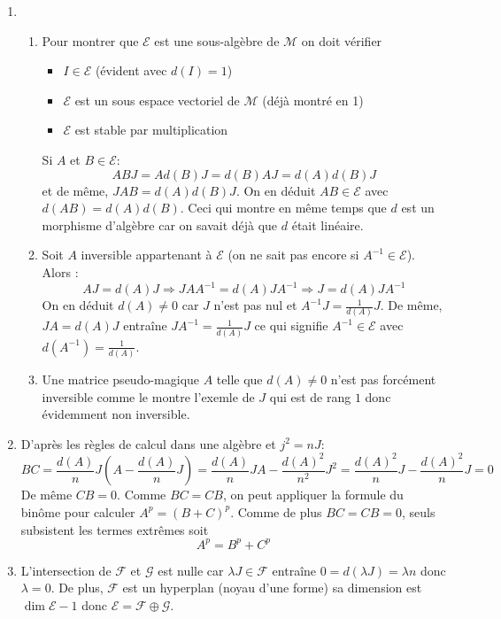 \begin{enumerate}
\item 
\begin{enumerate}
\item  Pour montrer que $\mathcal{E}$ est une sous-alg\`{e}bre de $\mathcal{M}$ on doit v\'{e}rifier

\begin{itemize}
\item  $I\in \mathcal{E}$ (\'{e}vident avec $d(I)=1$)

\item  $\mathcal{E}$ est un sous espace vectoriel de $\mathcal{M}$ (d\'{e}j\`{a} montr\'{e} en 1)

\item  $\mathcal{E}$ est stable par multiplication
\end{itemize}

Si $A$ et $B\in \mathcal{E}$:
\begin{displaymath}
ABJ=Ad(B)J=d(B)AJ=d(A)d(B)J 
\end{displaymath}
et de m\^{e}me, $JAB=d(A)d(B)J$. On en d\'{e}duit $AB\in \mathcal{E}$ avec $d(AB)=d(A)d(B)$. 
Ceci qui montre en m\^{e}me temps que $d$ est un morphisme d'algèbre car on savait d\'{e}j\`{a} que $d$ \'{e}tait lin\'{e}aire.

\item  Soit $A$ inversible appartenant \`{a} $\mathcal{E}$ (on ne sait pas encore si $A^{-1}\in \mathcal{E}$). Alors : 
\[
AJ=d(A)J\Rightarrow JAA^{-1}=d(A)JA^{-1}\Rightarrow J=d(A)JA^{-1}
\]
On en d\'{e}duit $d(A)\neq 0$ car $J$ n'est pas nul et $A^{-1}J=\frac{1}{d(A)}J$.\newline
De m\^{e}me, $JA=d(A)J$ entra\^{i}ne $JA^{-1}=\frac{1}{d(A)}J$ ce qui signifie $A^{-1}\in \mathcal{E}$ avec $d(A^{-1})=\frac{1}{d(A)}$.
\item Une matrice pseudo-magique $A$ telle que $d(A)\neq 0$ n'est pas forcément inversible comme le montre l'exemle de $J$ qui est de rang $1$ donc évidemment non inversible.
\end{enumerate}

\item  D'apr\`{e}s les r\`{e}gles de calcul dans une alg\`{e}bre et $j^2 = nJ$: 
\[
BC=\frac{d(A)}{n}J(A-\frac{d(A)}{n}J)
=\frac{d(A)}{n}JA-\frac{d(A)^{2}}{n^{2}}J^{2}
=\frac{d(A)^{2}}{n}J-\frac{d(A)^{2}}{n}J=0
\]
De m\^{e}me $CB=0$. Comme $BC=CB$, on peut appliquer la formule du bin\^{o}me pour calculer $A^{p}=(B+C)^{p}$. Comme de plus $BC=CB=0$, seuls subsistent les termes extrêmes soit 
\[
A^{p}=B^{p}+C^{p}
\]

\item  L'intersection de $\mathcal{F}$ et $\mathcal{G}$ est nulle car $\lambda J\in \mathcal{F}$ entra\^{i}ne $0=d(\lambda J)=\lambda n$ donc $\lambda =0$. De plus, $\mathcal{F}$ est un hyperplan (noyau d'une forme) sa dimension est $\dim \mathcal{E}-1$ donc $\mathcal{E=F}\oplus \mathcal{G}$.


\end{enumerate}
